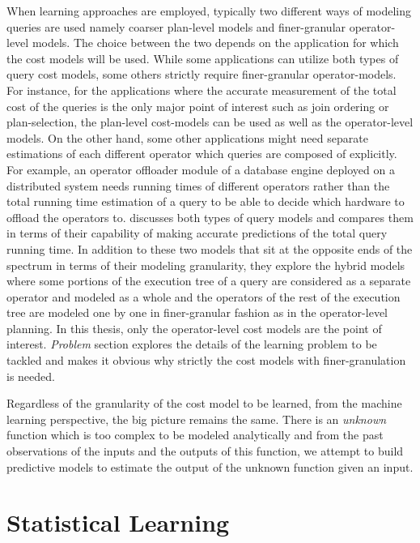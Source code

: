 When learning approaches are employed, typically two different ways of modeling queries are used namely coarser plan-level models and finer-granular operator-level models. The choice between the two depends on the application for which the cost models will be used. While some applications can utilize both types of query cost models, some others strictly require finer-granular operator-models. For instance, for the applications where the accurate measurement of the total cost of the queries is the only major point of interest such as join ordering or plan-selection, the plan-level cost-models can be used as well as the operator-level models. On the other hand, some other applications might need separate estimations of each different operator which queries are composed of explicitly. For example, an operator offloader module of a database engine deployed on a distributed system needs running times of different operators rather than the total running time estimation of a query to be able to decide which hardware to offload the operators to. \cite{akdere_learning-based_2012} discusses both types of query models and compares them in terms of their capability of making accurate predictions of the total query running time. In addition to these two models that sit at the opposite ends of the spectrum in terms of their modeling granularity, they explore the hybrid models where some portions of the execution tree of a query are considered as a separate operator and modeled as a whole and the operators of the rest of the execution tree are modeled one by one in finer-granular fashion as in the operator-level planning. In this thesis, only the operator-level cost models are the point of interest. {\it{Problem}} section explores the details of the learning problem to be tackled and makes it obvious why strictly the cost models with finer-granulation is needed. 

Regardless of the granularity of the cost model to be learned, from the machine learning perspective, the big picture remains the same. There is an {\it{unknown}} function which is too complex to be modeled analytically and from the past observations of the inputs and the outputs of this function, we attempt to build predictive models to estimate the output of the unknown function given an input.

\section{Statistical Learning}

